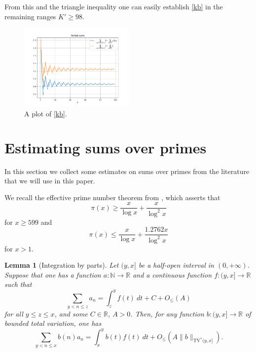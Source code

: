 \documentclass[12pt,a4paper,reqno]{amsart}
\numberwithin{equation}{section}
\theoremstyle{plain}
\newtheorem{lemma}[theorem]{Lemma}
\theoremstyle{definition}
\newcommand\R{\mathbb{R}}
\newcommand\N{\mathbb{N}}
\begin{document}
    From this and the triangle inequality one can easily establish \eqref{kb} in the remaining ranges $K' \geq 98$.
  
  \begin{figure}
  \centering
  \includegraphics[width=0.5\textwidth]{key_ineq.png}
  \caption{A plot of \eqref{kb}.}
  \label{fig:kb}
  \end{figure}

\section{Estimating sums over primes}\label{primes-sec}

In this section we collect some estimates on sums over primes from the literature that we will use in this paper.

We recall the effective prime number theorem from \cite[Corollary 5.2]{dusart}, which asserts that
\begin{equation}\label{pi-lower}
  \pi(x) \geq \frac{x}{\log x} + \frac{x}{\log^2 x}
\end{equation}
for $x \geq 599$ and
\begin{equation}\label{pi-upper}
  \pi(x) \leq \frac{x}{\log x} + \frac{1.2762 x}{\log^2 x}
\end{equation}
for $x >1$.  


\begin{lemma}[Integration by parts]\label{integ-lemma}  Let $(y,x]$ be a half-open interval in $(0,+\infty)$.  Suppose that one has a function $a \colon \N \to \R$ and a continuous function $f: (y,x] \to \R$ such that 
  $$ \sum_{y < n \leq z} a_n = \int_z^y f(t)\ dt + C + O_{\leq}(A)$$
  for all $y \leq z \leq x$, and some $C \in \R$, $A>0$.  Then, for any function $b: (y,x] \to \R$ of bounded total variation, one has
\begin{equation}\label{tve}
   \sum_{y < n \leq x} b(n) a_n = \int_x^y b(t) f(t)\ dt + O_{\leq}(A\|b\|_{\mathrm{TV}^*(y,x]}).
\end{equation}
\end{lemma}
\end{document}

